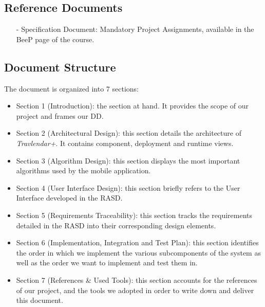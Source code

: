 \subsection{Reference Documents}
\begin{itemize}
		\item[-] \textsf{Specification Document: Mandatory Project Assignments}, available in the BeeP page of the course.
\end{itemize} 

\subsection{Document Structure}
The document is organized into 7 sections:

\begin{itemize}
	\item Section 1 (Introduction): the section at hand. It provides the scope of our project and frames our DD.
	\item Section 2 (Architectural Design): this section details the architecture of \textit{Travlendar+}. It contains component, deployment and runtime views.
	\item Section 3 (Algorithm Design): this section displays the most important algorithms used by the mobile application.
	\item Section 4 (User Interface Design): this section briefly refers to the User Interface developed in the RASD.
	\item Section 5 (Requirements Traceability): this section tracks the requirements detailed in the RASD into their corresponding design elements.
	\item Section 6 (Implementation, Integration and Test Plan): this section identifies the order in which we implement the various subcomponents of the system as well as the order we want to implement and test them in.
	\item Section 7 (References \& Used Tools): this section accounts for the references of our project, and the tools we adopted in order to write down and deliver this document.
\end{itemize}
